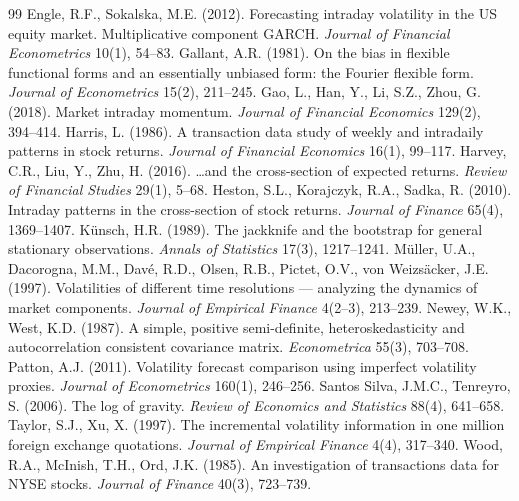 \documentclass[11pt,a4paper]{article}
\begin{document}
\begin{thebibliography}{99}
 Engle, R.F., Sokalska, M.E. (2012). Forecasting intraday volatility in the US equity market. Multiplicative component GARCH. \emph{Journal of Financial Econometrics} 10(1), 54--83.
 Gallant, A.R. (1981). On the bias in flexible functional forms and an essentially unbiased form: the Fourier flexible form. \emph{Journal of Econometrics} 15(2), 211--245.
 Gao, L., Han, Y., Li, S.Z., Zhou, G. (2018). Market intraday momentum. \emph{Journal of Financial Economics} 129(2), 394--414.
 Harris, L. (1986). A transaction data study of weekly and intradaily patterns in stock returns. \emph{Journal of Financial Economics} 16(1), 99--117.
 Harvey, C.R., Liu, Y., Zhu, H. (2016). \ldots and the cross-section of expected returns. \emph{Review of Financial Studies} 29(1), 5--68.
 Heston, S.L., Korajczyk, R.A., Sadka, R. (2010). Intraday patterns in the cross-section of stock returns. \emph{Journal of Finance} 65(4), 1369--1407.
 K\"unsch, H.R. (1989). The jackknife and the bootstrap for general stationary observations. \emph{Annals of Statistics} 17(3), 1217--1241.
 M\"uller, U.A., Dacorogna, M.M., Dav\'e, R.D., Olsen, R.B., Pictet, O.V., von Weizs\"acker, J.E. (1997). Volatilities of different time resolutions --- analyzing the dynamics of market components. \emph{Journal of Empirical Finance} 4(2--3), 213--239.
 Newey, W.K., West, K.D. (1987). A simple, positive semi-definite, heteroskedasticity and autocorrelation consistent covariance matrix. \emph{Econometrica} 55(3), 703--708.
 Patton, A.J. (2011). Volatility forecast comparison using imperfect volatility proxies. \emph{Journal of Econometrics} 160(1), 246--256.
 Santos Silva, J.M.C., Tenreyro, S. (2006). The log of gravity. \emph{Review of Economics and Statistics} 88(4), 641--658.
 Taylor, S.J., Xu, X. (1997). The incremental volatility information in one million foreign exchange quotations. \emph{Journal of Empirical Finance} 4(4), 317--340.
 Wood, R.A., McInish, T.H., Ord, J.K. (1985). An investigation of transactions data for NYSE stocks. \emph{Journal of Finance} 40(3), 723--739.
\end{thebibliography}
\end{document}
